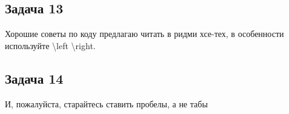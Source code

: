 \documentclass[a4paper, fleqn]{article}
\begin{document}
    \subsection*{Задача 13}
    Хорошие советы по коду предлагаю читать в ридми хсе-тех, в особенности используйте \textbackslash left 
    \textbackslash right.
    
    \subsection*{Задача 14}
    И, пожалуйста, старайтесь ставить пробелы, а не табы
    
    
    
    
    
    
    
    
    
    
\end{document}
